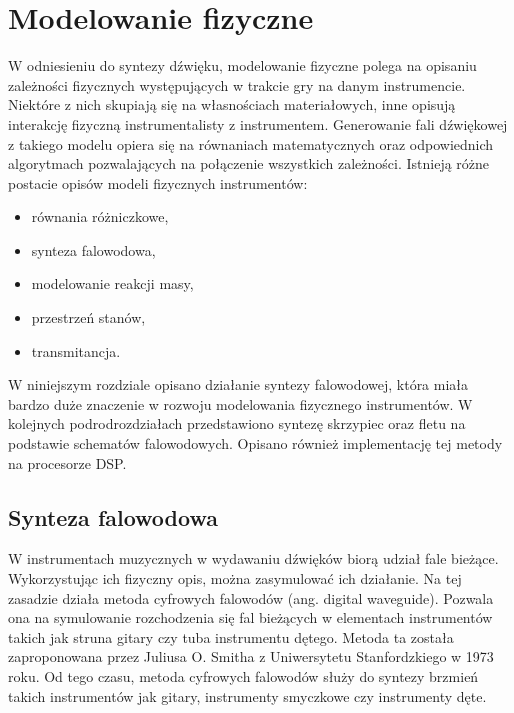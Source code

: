\chapter{Modelowanie fizyczne}
W odniesieniu do syntezy dźwięku, modelowanie fizyczne polega na opisaniu zależności fizycznych występujących w trakcie gry na danym instrumencie. Niektóre z nich skupiają się na własnościach materiałowych, inne opisują interakcję fizyczną instrumentalisty z instrumentem. Generowanie fali dźwiękowej z takiego modelu opiera się na równaniach matematycznych oraz odpowiednich algorytmach pozwalających na połączenie wszystkich zależności. Istnieją różne postacie opisów modeli fizycznych instrumentów:
\begin{itemize}
	\item równania różniczkowe,
	\item synteza falowodowa,
	\item modelowanie reakcji masy,
	\item przestrzeń stanów,
	\item transmitancja.
\end{itemize}

W niniejszym rozdziale opisano działanie syntezy falowodowej, która miała bardzo duże znaczenie w rozwoju modelowania fizycznego instrumentów. W kolejnych podrodrozdziałach przedstawiono syntezę skrzypiec oraz fletu na podstawie schematów falowodowych. Opisano również implementację tej metody na procesorze DSP.


\section{Synteza falowodowa}
W instrumentach muzycznych w wydawaniu dźwięków biorą udział fale bieżące. Wykorzystując ich fizyczny opis, można zasymulować ich działanie. Na tej zasadzie działa metoda cyfrowych falowodów (ang. digital waveguide). Pozwala ona na symulowanie  rozchodzenia się fal bieżących w elementach instrumentów takich jak struna gitary czy tuba instrumentu dętego. Metoda ta została zaproponowana przez Juliusa O. Smitha z Uniwersytetu Stanfordzkiego w 1973 roku. Od tego czasu, metoda cyfrowych falowodów służy do syntezy brzmień takich instrumentów jak gitary, instrumenty smyczkowe czy instrumenty dęte.

